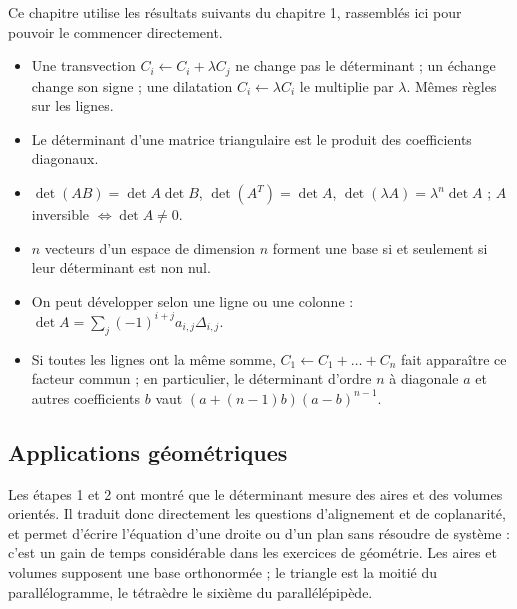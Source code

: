\documentclass[a4paper,11pt]{article}
\numberwithin{equation}{section}
\numberwithin{figure}{section}
\numberwithin{table}{section}
\theoremstyle{enonce}
\theoremstyle{exemple}
\theoremstyle{remarque}
\begin{document}
\begin{commencer}
Ce chapitre utilise les résultats suivants du chapitre 1, rassemblés ici pour pouvoir le commencer directement.
\begin{itemize}
\item Une transvection $C_i\leftarrow C_i+\lambda C_j$ ne change pas le déterminant ; un échange change son signe ; une
      dilatation $C_i\leftarrow\lambda C_i$ le multiplie par $\lambda$. Mêmes règles sur les lignes.
\item Le déterminant d'une matrice triangulaire est le produit des coefficients diagonaux.
\item $\det(AB)=\det A\det B$, $\det(A^T)=\det A$, $\det(\lambda A)=\lambda^n\det A$ ; $A$ inversible $\iff\det A\neq0$.
\item $n$ vecteurs d'un espace de dimension $n$ forment une base si et seulement si leur déterminant est non nul.
\item On peut développer selon une ligne ou une colonne : $\det A=\sum_j(-1)^{i+j}a_{i,j}\Delta_{i,j}$.
\item Si toutes les lignes ont la même somme, $C_1\leftarrow C_1+\dots+C_n$ fait apparaître ce facteur commun ;
      en particulier, le déterminant d'ordre $n$ à diagonale $a$ et autres coefficients $b$ vaut $(a+(n-1)b)(a-b)^{n-1}$.
\end{itemize}
\end{commencer}

\subsection{Applications géométriques}

Les étapes 1 et 2 ont montré que le déterminant mesure des aires et des volumes orientés. Il traduit donc directement
les questions d'alignement et de coplanarité, et permet d'écrire l'équation d'une droite ou d'un plan sans résoudre de
système : c'est un gain de temps considérable dans les exercices de géométrie. Les aires et volumes supposent une base orthonormée ; le triangle est la
moitié du parallélogramme, le tétraèdre le sixième du parallélépipède.
\end{document}
